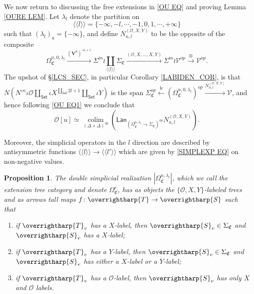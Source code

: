 \documentclass[a4paper,10pt
,draft
]{article}%
\numberwithin{equation}{section}
\numberwithin{figure}{section}
\newtheorem{proposition}[equation]{Proposition}%
\theoremstyle{definition} %
\newcommand{\vect}[1]{\text{\overrightharp{\ensuremath{#1}}}}
\DeclareMathOperator{\colim}{colim}%
\newcommand{\V}{\ensuremath{\mathcal V}}
\renewcommand{\O}{\ensuremath{\mathcal O}}
\newcommand{\1}{\ensuremath{\mathbbm 1}}%
\newcommand{\OC}{\Omega_{\mathfrak C}}
\begin{document}
We now return to discussing the free extensions in \eqref{OU EQ}
and proving Lemma \ref{OURE LEM}.
%
Let $\lambda_l$ denote the partition on 
\[
\langle \langle l \rangle \rangle
=
\{-\infty,-l,\cdots,-1,0,1,\cdots,+\infty\}
\]
such that $\left(\lambda_l\right)_a = \{-\infty\}$,
and define $N_{n,l}^{(\O,X,Y)}$ to be the opposite of the composite
\[
      \Omega_{\mathfrak C}^{n,0,\lambda_l} \xrightarrow{(\boldsymbol{V}^0)^{\circ n+1}}
      \Sigma^{\wr n} \wr \coprod_{\langle \langle l \rangle \rangle} \Sigma_{\mathfrak C} \xrightarrow{(\O,X,\dots,X,Y)}
      \Sigma^{\wr n} \wr \V^{op} \xrightarrow{\otimes}
      \V^{op}.
\]
The upshot of \S \ref{LCS_SEC}, in particular Corollary \ref{LABIDEN_COR}, is that
$\mbox{$N \left(N^{\circ n} \iota \O \amalg_{\mathsf{Set}} \iota X^{\amalg_{\mathsf{Set}} 2l +1}\amalg_{\mathsf{Set}} \iota Y \right)$}$
is the span
$\mbox{$\Sigma_{\mathfrak C}^{op} \xleftarrow{\mathsf{lr}} (\Omega_{\mathfrak C}^{n,0,\lambda_l})^{op} \xrightarrow{N_{n,l}^{(\O,X,Y)}} \V$}$,
and hence following \eqref{OU EQ1} we conclude that
\begin{equation}\label{1STRED EQ}
\O[u] \simeq
\mathop{\colim}\limits_{(\Delta \times \Delta)^{op}}
\left(
	\mathsf{Lan}_{\left(\Omega_{\mathfrak C}^{n,\lambda_l} \to \Sigma_{\mathfrak C}\right)^{op}} N_{n,l}^{(\O,X,Y)}
\right).
\end{equation}


Moreover, the simplicial operators in the $l$ direction are described by antisymmetric functions $\langle \langle l \rangle \rangle
 \to \langle \langle l' \rangle \rangle
$
which are given by \eqref{SIMPLEXP EQ} on non-negative values.


\begin{proposition}\label{EXTENTREE PROP}
The double simplicial realization
$|\Omega_{\mathfrak C}^{n,\lambda_l}|$,
which we call the \textit{extension tree category}
and denote
$\OC^e$, has as objects the 
$\{\O,X,Y\}$-labeled trees
and as arrows tall maps $f \colon \vect{T} \to \vect{S}$ such that
\begin{enumerate}[label=(\roman*)]
\item if $\vect{T}_v$ has a $X$-label, 
then $\vect{S}_v \in \Sigma_{\mathfrak{C}}$ and
$\vect{S}_v $ has a $X$-label;
\item if $\vect{T}_v$ has a $Y$-label, then 
$\vect{S}_v \in \Sigma_{\mathfrak{C}}$ and
$\vect{S}_v $ has either a $X$-label or a $Y$-label;
\item if $\vect{T}_v$ has a $\O$-label, then 
$\vect{S}_v $ has only $X$ and $\O$ labels.
\end{enumerate}
\end{proposition}
\end{document}
